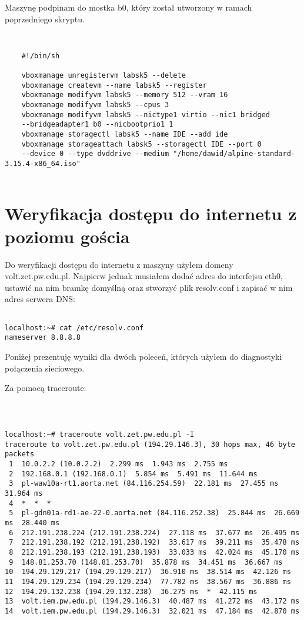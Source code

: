 \documentclass[a4paper,11pt]{article}
\begin{document}
Maszynę podpinam do mostka b0, który został utworzony w ramach poprzedniego skryptu.

{\tt
\begin{verbatim}
    #!/bin/sh
    
    vboxmanage unregistervm labsk5 --delete
    vboxmanage createvm --name labsk5 --register
    vboxmanage modifyvm labsk5 --memory 512 --vram 16
    vboxmanage modifyvm labsk5 --cpus 3
    vboxmanage modifyvm labsk5 --nictype1 virtio --nic1 bridged 
    --bridgeadapter1 b0 --nicbootprio1 1
    vboxmanage storagectl labsk5 --name IDE --add ide
    vboxmanage storageattach labsk5 --storagectl IDE --port 0 
    --device 0 --type dvddrive --medium "/home/dawid/alpine-standard-3.15.4-x86_64.iso"
    
\end{verbatim}
}

\section{Weryfikacja dostępu do internetu z poziomu gościa}

Do weryfikacji dostępu do internetu z maszyny użyłem domeny volt.zet.pw.edu.pl. Najpierw jednak musiałem dodać adres do interfejsu eth0, ustawić na nim bramkę domyślną oraz stworzyć plik resolv.conf i zapisać w nim adres serwera DNS:

{\begin{verbatim}

localhost:~# cat /etc/resolv.conf
nameserver 8.8.8.8

\end{verbatim}}

Poniżej prezentuję wyniki dla dwóch poleceń, których użyłem do diagnostyki połączenia sieciowego.

Za pomocą traceroute:

{\tt
\begin{verbatim}

localhost:~# traceroute volt.zet.pw.edu.pl -I
traceroute to volt.zet.pw.edu.pl (194.29.146.3), 30 hops max, 46 byte packets
 1  10.0.2.2 (10.0.2.2)  2.299 ms  1.943 ms  2.755 ms
 2  192.168.0.1 (192.168.0.1)  5.854 ms  5.491 ms  11.644 ms
 3  pl-waw10a-rt1.aorta.net (84.116.254.59)  22.181 ms  27.455 ms  31.964 ms
 4  *  *  *
 5  pl-gdn01a-rd1-ae-22-0.aorta.net (84.116.252.38)  25.844 ms  26.669 ms  28.440 ms
 6  212.191.238.224 (212.191.238.224)  27.118 ms  37.677 ms  26.495 ms
 7  212.191.238.192 (212.191.238.192)  33.617 ms  39.211 ms  35.478 ms
 8  212.191.238.193 (212.191.238.193)  33.033 ms  42.024 ms  45.170 ms
 9  148.81.253.70 (148.81.253.70)  35.878 ms  34.451 ms  36.667 ms
10  194.29.129.217 (194.29.129.217)  36.910 ms  38.514 ms  42.126 ms
11  194.29.129.234 (194.29.129.234)  77.782 ms  38.567 ms  36.886 ms
12  194.29.132.238 (194.29.132.238)  36.275 ms  *  42.115 ms
13  volt.iem.pw.edu.pl (194.29.146.3)  40.487 ms  41.272 ms  43.172 ms
14  volt.iem.pw.edu.pl (194.29.146.3)  32.021 ms  47.184 ms  42.870 ms

\end{verbatim}
}
\end{document}
